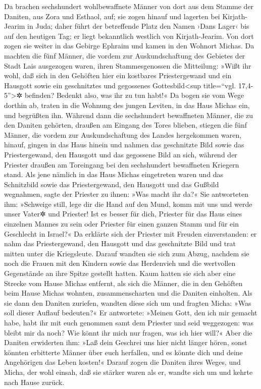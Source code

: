 Da brachen sechshundert wohlbewaffnete Männer von dort
aus dem Stamme der Daniten, aus Zora und Esthaol, auf;
sie zogen hinauf und lagerten bei Kirjath-Jearim in Juda;
daher führt der betreffende Platz den Namen ›Dans Lager‹ bis auf den
heutigen Tag; er liegt bekanntlich westlich von Kirjath-Jearim.
Von dort zogen sie weiter in das Gebirge Ephraim und
kamen in den Wohnort Michas. Da machten die fünf Männer,
die vordem zur Auskundschaftung des Gebietes der Stadt Lais ausgezogen
waren, ihren Stammesgenossen die Mitteilung: »Wißt ihr wohl, daß sich in
den Gehöften hier ein kostbares Priestergewand und ein Hausgott sowie
ein geschnitztes und gegossenes Gottesbild\textless sup title=``vgl.
17,4-5''\textgreater✲ befinden? Bedenkt also, was ihr zu tun habt!«
Da bogen sie vom Wege dorthin ab, traten in die Wohnung
des jungen Leviten, in das Haus Michas ein, und begrüßten ihn.
Während dann die sechshundert bewaffneten Männer, die zu
den Daniten gehörten, draußen am Eingang des Tores blieben,
stiegen die fünf Männer, die vordem zur Auskundschaftung
des Landes hergekommen waren, hinauf, gingen in das Haus hinein und
nahmen das geschnitzte Bild sowie das Priestergewand, den Hausgott und
das gegossene Bild an sich, während der Priester draußen am Toreingang
bei den sechshundert bewaffneten Kriegern stand. Als jene
nämlich in das Haus Michas eingetreten waren und das Schnitzbild sowie
das Priestergewand, den Hausgott und das Gußbild wegnahmen, sagte der
Priester zu ihnen: »Was macht ihr da?« Sie antworteten
ihm: »Schweige still, lege dir die Hand auf den Mund, komm mit uns und
werde unser Vater✲ und Priester! Ist es besser für dich, Priester für
das Haus eines einzelnen Mannes zu sein oder Priester für einen ganzen
Stamm und für ein Geschlecht in Israel?« Da erklärte sich
der Priester mit Freuden einverstanden: er nahm das Priestergewand, den
Hausgott und das geschnitzte Bild und trat mitten unter die Kriegsleute.
Darauf wandten sie sich zum Abzug, nachdem sie noch die
Frauen mit den Kindern sowie das Herdenvieh und die wertvollen
Gegenstände an ihre Spitze gestellt hatten. Kaum hatten
sie sich aber eine Strecke vom Hause Michas entfernt, als sich die
Männer, die in den Gehöften beim Hause Michas wohnten, zusammenscharten
und die Daniten einholten. Als sie dann den Daniten
zuriefen, wandten diese sich um und fragten Micha: »Was soll dieser
Auflauf bedeuten?« Er antwortete: »Meinen Gott, den ich
mir gemacht habe, habt ihr mit euch genommen samt dem Priester und seid
weggezogen: was bleibt mir da noch? Wie könnt ihr mich nur fragen, was
ich hier will?« Aber die Daniten erwiderten ihm: »Laß
dein Geschrei uns hier nicht länger hören, sonst könnten erbitterte
Männer über euch herfallen, und es könnte dich und deine Angehörigen das
Leben kosten!« Darauf zogen die Daniten ihres Weges, und
Micha, der wohl einsah, daß sie stärker waren als er, wandte sich um und
kehrte nach Hause zurück.

